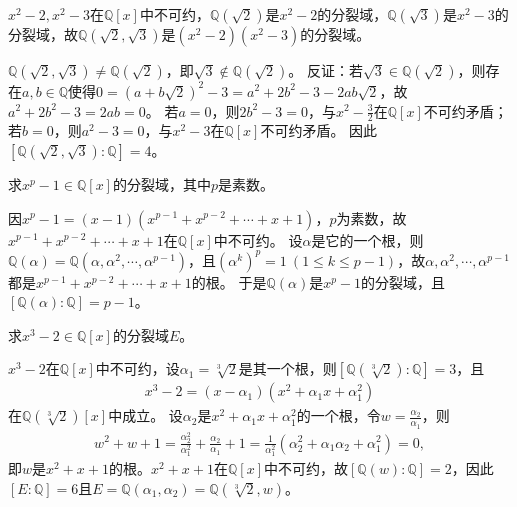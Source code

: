 \documentclass[../../main.tex]{subfiles}%
\begin{document}
\begin{solution}

$x^2-2,x^2-3$在$\mathbb{Q}[x]$中不可约，$\mathbb{Q}(\sqrt{2})$是$x^2-2$的分裂域，$\mathbb{Q}(\sqrt{3})$是$x^2-3$的分裂域，故$\mathbb{Q}(\sqrt{2},\sqrt{3})$是$(x^2-2)(x^2-3)$的分裂域。

\end{solution}

\begin{remark}
$\mathbb{Q}(\sqrt{2},\sqrt{3})\neq\mathbb{Q}(\sqrt{2})$，即$\sqrt{3}\notin\mathbb{Q}(\sqrt{2})$。
反证：若$\sqrt{3}\in\mathbb{Q}(\sqrt{2})$，则存在$a,b\in\mathbb{Q}$使得$0=(a+b\sqrt{2})^2-3=a^2+2b^2-3-2ab\sqrt{2}$，故$a^2+2b^2-3=2ab=0$。
若$a=0$，则$2b^2-3=0$，与$x^2-\frac{3}{2}$在$\mathbb{Q}[x]$不可约矛盾；若$b=0$，则$a^2-3=0$，与$x^2-3$在$\mathbb{Q}[x]$不可约矛盾。
因此$[\mathbb{Q}(\sqrt{2},\sqrt{3}):\mathbb{Q}]=4$。
\end{remark}

\begin{example}
求$x^p-1\in\mathbb{Q}[x]$的分裂域，其中$p$是素数。
\end{example}

\begin{solution}

因$x^p-1=(x-1)(x^{p-1}+x^{p-2}+\cdots+x+1)$，$p$为素数，故$x^{p-1}+x^{p-2}+\cdots+x+1$在$\mathbb{Q}[x]$中不可约。
设$\alpha$是它的一个根，则$\mathbb{Q}(\alpha)=\mathbb{Q}(\alpha,\alpha^2,\cdots,\alpha^{p-1})$，且$(\alpha^k)^p=1\ (1\leqslant k\leqslant p-1)$，故$\alpha,\alpha^2,\cdots,\alpha^{p-1}$都是$x^{p-1}+x^{p-2}+\cdots+x+1$的根。
于是$\mathbb{Q}(\alpha)$是$x^p-1$的分裂域，且$[\mathbb{Q}(\alpha):\mathbb{Q}]=p-1$。

\end{solution}

\begin{example}
求$x^3-2\in\mathbb{Q}[x]$的分裂域$E$。
\end{example}

\begin{solution}

$x^3-2$在$\mathbb{Q}[x]$中不可约，设$\alpha_1=\sqrt[3]{2}$是其一个根，则$[\mathbb{Q}(\sqrt[3]{2}):\mathbb{Q}]=3$，且
\begin{align*}
x^3-2=(x-\alpha_1)(x^2+\alpha_1x+\alpha_1^2)
\end{align*}
在$\mathbb{Q}(\sqrt[3]{2})[x]$中成立。
设$\alpha_2$是$x^2+\alpha_1x+\alpha_1^2$的一个根，令$w=\frac{\alpha_2}{\alpha_1}$，则
\begin{align*}
w^2+w+1=\frac{\alpha_2^2}{\alpha_1^2}+\frac{\alpha_2}{\alpha_1}+1
=\frac{1}{\alpha_1^2}(\alpha_2^2+\alpha_1\alpha_2+\alpha_1^2)=0,
\end{align*}
即$w$是$x^2+x+1$的根。$x^2+x+1$在$\mathbb{Q}[x]$中不可约，故$[\mathbb{Q}(w):\mathbb{Q}]=2$，因此$[E:\mathbb{Q}]=6$且$E=\mathbb{Q}(\alpha_1,\alpha_2)=\mathbb{Q}(\sqrt[3]{2},w)$。

\end{solution}
\end{document}
